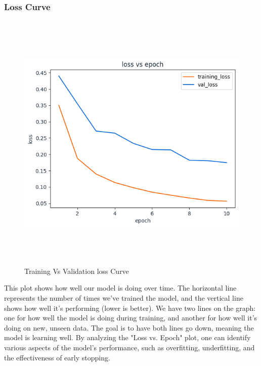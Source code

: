 \subsubsection{Loss Curve}
\begin{figure}[ht]
    \centering
    \includegraphics[width= 5in, height =5in ]{img/lossVsAccuracy.png}
    \caption{{Training Vs Validation loss Curve}}
\end{figure}
This plot shows how well our model is doing over time. The horizontal line represents the number of times we've trained the model, and the vertical line shows how well it's performing (lower is better). We have two lines on the graph: one for how well the model is doing during training, and another for how well it's doing on new, unseen data. The goal is to have both lines go down, meaning the model is learning well. By analyzing the "Loss vs. Epoch" plot, one can identify various aspects of the model's performance, such as overfitting, underfitting, and the effectiveness of early stopping.

\newpage
